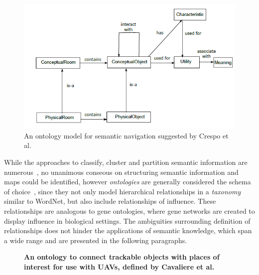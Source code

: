 \documentclass[a4paper,11pt]{article}
\theoremstyle{mytheor}
\begin{document}
\begin{figure}[t]
\centering
\includegraphics[]{1-2-Crespo-OnotologyForSemNavigation.png}
\caption{An ontology model for semantic navigation suggested by Crespo et al.~\cite{crespo_reasoning_2018}}
\label{fig:LitMapsCrespo}
\end{figure}
While the approaches to classify, cluster and partition semantic information are numerous~\cite{saffiotti_robots_2011,galindo_robot_2008,crespo_reasoning_2018,tenorth_knowrob-map_2010,cavaliere_empowering_2018,alirezaie_exploiting_2017}, no unanimous conseous on structuring semantic information and maps could be identified, however \textit{ontologies} are generally considered the schema of choice~\cite{kostavelis_semantic_2015}, since they not only model hierarchical relationships in a \textit{taxonomy} similar to WordNet, but also include relationships of influence. These relationships are analogous to gene ontologies, where gene networks are created to display influence in biological settings. The ambiguities surrounding definition of relationships does not hinder the applications of semantic knowledge, which span a wide range and are presented in the following paragraphs.
\begin{figure}[b]
\centering
{}
\caption{\bf{An ontology to connect trackable objects with places of interest for use with UAVs, defined by Cavaliere et al.~\cite{cavaliere_empowering_2018}}}
\label{fig:LitMapsCavaliere}
\end{figure} 
\end{document}
